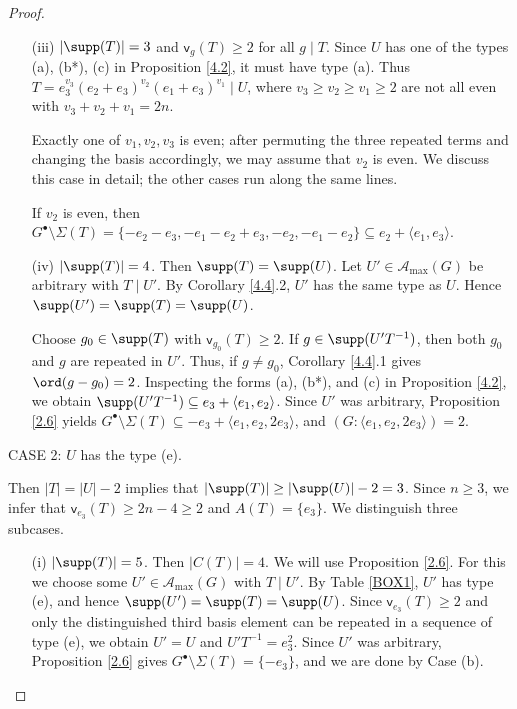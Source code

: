 \documentclass[a4paper, 10pt]{amsart}
\theoremstyle{plain}
\theoremstyle{definition}
\numberwithin{equation}{section}
\begin{document}
{\begin{proof}
\begin{itemize}
		If $T_K=e_3^{2n-2}(a+xe_3)$, then $K^{\bullet}\setminus\Sigma(T_K)=\{-e_3,a+(x-1)e_3\}$. We have $G^{\bullet}\setminus\Sigma(T)=\{-e_3,a+(x-1)e_3,g-e_3,g+a+(x-1)e_3\}$. Let $H=\langle a+xe_3,g,2e_3\rangle$. Since $K=\langle a,e_3\rangle$ and $g\notin K$, the images of $a+xe_3$ and $g$ modulo $2G=\langle2e_3\rangle$ are linearly independent, and their span does not contain $e_3+2G$. Thus $(G\colon H)=2$ and $e_3\notin H$, and therefore $G^{\bullet}\setminus\Sigma(T)\subseteq-e_3+H$.
		
		\item[(iii)] $|\supp(T)|=3$ and $\mathsf{v}_g(T)\ge 2$ for all $g\mid T$. Since $U$ has one of the types (a), (b*), (c) in Proposition \ref{4.2}, it must have type (a). Thus $T= e_3^{v_3} (e_2+e_3)^{v_2} (e_1+e_3)^{v_1}\mid U$, where $v_3 \ge v_2 \ge v_1\geq 2$ are not all even with $v_3+v_2+v_1=2n$.
		
		Exactly one of $v_1,v_2,v_3$ is even; after permuting the three repeated terms and changing the basis accordingly, we may assume that $v_2$ is even. We discuss this case in detail; the other cases run along the same lines.
		
		If $v_2$ is even, then $G^{\bullet}\setminus \Sigma (T)=\{-e_2-e_3,-e_1-e_2+e_3, -e_2,-e_1-e_2\}\subseteq e_2+ \langle e_1,e_3\rangle$.
		
		\item[(iv)] $|\supp(T)|=4$. Then $\supp(T)=\supp(U)$. Let $U'\in\mathcal A_{\max}(G)$ be arbitrary with $T\mid U'$. By Corollary \ref{4.4}.2, $U'$ has the same type as $U$. Hence $\supp(U')=\supp(T)=\supp(U)$.
			
			Choose $g_0\in\supp(T)$ with $\mathsf v_{g_0}(T)\ge2$. If $g\in\supp(U'T^{-1})$, then both $g_0$ and $g$ are repeated in $U'$. Thus, if $g\ne g_0$, Corollary \ref{4.4}.1 gives $\ord(g-g_0)=2$. Inspecting the forms (a), (b*), and (c) in Proposition \ref{4.2}, we obtain $\supp(U'T^{-1})\subseteq e_3+\langle e_1,e_2\rangle$. Since $U'$ was arbitrary, Proposition \ref{2.6} yields $G^{\bullet}\setminus\Sigma(T)\subseteq -e_3+\langle e_1,e_2,2e_3\rangle$, and $(G:\langle e_1,e_2,2e_3\rangle)=2$.
	\end{itemize}
	
	\smallskip
	\noindent
	CASE 2: $U$ has the type (e).
	
	Then $|T|=|U|-2$ implies that $|\supp(T)|\ge |\supp(U)|-2=3$. Since $n\ge 3$, we infer that $\mathsf{v}_{e_3}(T)\ge 2n-4\ge 2$ and $A(T)=\{e_3\}$. We distinguish three subcases.
	
	\begin{itemize}
		\item[(i)] $|\supp(T)|=5$. Then $|C(T)|=4$. We will use Proposition \ref{2.6}. For this we choose some  $U'\in\mathcal A_{\max}(G)$  with $T\mid U'$. By Table \ref{BOX1}, $U'$ has type (e), and hence $\supp(U')=\supp(T)=\supp(U)$. Since $\mathsf v_{e_3}(T)\ge2$ and only the distinguished third basis element can be repeated in a sequence of type (e), we obtain $U'=U$ and $U'T^{-1}=e_3^2$. Since $U'$ was arbitrary, Proposition \ref{2.6} gives $G^{\bullet}\setminus\Sigma(T)=\{-e_3\}$, and we are done by Case (b).
		

\end{itemize}
\end{proof}}
\end{document}
